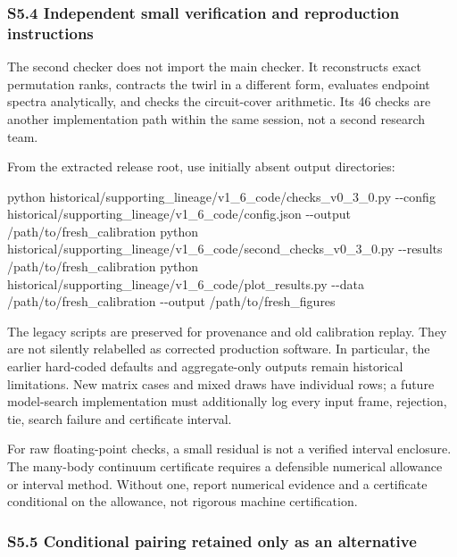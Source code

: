 \documentclass[
  10pt,
  a4paper,
]{article}
\newenvironment{Shaded}{}{}
\newcommand{\NormalTok}[1]{#1}
\begin{document}
\subsubsection{S5.4 Independent small verification and reproduction
instructions}\label{s5.4-independent-small-verification-and-reproduction-instructions}

The second checker does not import the main checker. It reconstructs
exact permutation ranks, contracts the twirl in a different form,
evaluates endpoint spectra analytically, and checks the circuit-cover
arithmetic. Its 46 checks are another implementation path within the
same session, not a second research team.

From the extracted release root, use initially absent output
directories:

\begin{Shaded}
\begin{Highlighting}[]
\NormalTok{python historical/supporting\_lineage/v1\_6\_code/checks\_v0\_3\_0.py {-}{-}config historical/supporting\_lineage/v1\_6\_code/config.json {-}{-}output /path/to/fresh\_calibration}
\NormalTok{python historical/supporting\_lineage/v1\_6\_code/second\_checks\_v0\_3\_0.py {-}{-}results /path/to/fresh\_calibration}
\NormalTok{python historical/supporting\_lineage/v1\_6\_code/plot\_results.py {-}{-}data /path/to/fresh\_calibration {-}{-}output /path/to/fresh\_figures}
\end{Highlighting}
\end{Shaded}

The legacy scripts are preserved for provenance and old calibration
replay. They are not silently relabelled as corrected production
software. In particular, the earlier hard-coded defaults and
aggregate-only outputs remain historical limitations. New matrix cases
and mixed draws have individual rows; a future model-search
implementation must additionally log every input frame, rejection, tie,
search failure and certificate interval.

For raw floating-point checks, a small residual is not a verified
interval enclosure. The many-body continuum certificate requires a
defensible numerical allowance or interval method. Without one, report
numerical evidence and a certificate conditional on the allowance, not
rigorous machine certification.

\subsubsection{S5.5 Conditional pairing retained only as an
alternative}\label{s5.5-conditional-pairing-retained-only-as-an-alternative}
\end{document}
